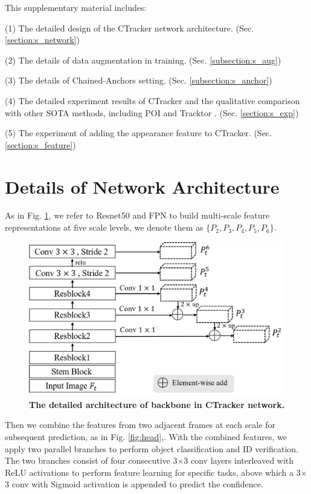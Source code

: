 \documentclass[crop=false]{standalone}
\begin{document}
This supplementary material includes:

\noindent(1) The detailed design of the CTracker network architecture. (Sec. \ref{section:s_network})

\noindent(2) The details of data augmentation in training. (Sec. \ref{subsection:s_aug})

\noindent(3) The details of Chained-Anchors setting. (Sec. \ref{subsection:s_anchor})

\noindent(4) The detailed experiment results of CTracker and the qualitative comparison with other SOTA methods, including POI \cite{yu2016poi} and Tracktor \cite{bergmann2019tracking}. (Sec. \ref{section:s_exp})

\noindent(5) The experiment of adding the appearance feature to CTracker. (Sec. \ref{section:s_feature})

\section{Details of Network Architecture\label{section:s_network}}

As in Fig. \ref{fig:backbone}, we refer to Resnet50 \cite{he2016deep} and FPN \cite{lin2017feature} to build multi-scale feature representations at five scale levels, we denote them as $\{P_2, P_3, P_4, P_5, P_6\}$.

\begin{figure}[ht]
\vspace{-5mm}
\centering{}\includegraphics[width=0.54\columnwidth]{figure/figure2.png}
\vspace{-5mm}
\caption{\label{fig:backbone}\textbf{The detailed architecture of backbone in CTracker network.}}
\vspace{-3mm}
\end{figure}

Then we combine the features from two adjacent frames at each scale for subsequent prediction, as in Fig. \ref{fig:head},. With the combined features, we apply two parallel branches to perform object classification and ID verification. The two branches consist of four consecutive 3$\times$3 conv layers interleaved with ReLU activations to perform feature learning for specific tasks, above which a 3$\times$3 conv with Sigmoid activation is appended to predict the confidence.  
\end{document}
